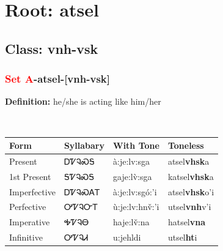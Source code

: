 \needspace{4in}
\section*{Root: atsel}
\nopagebreak
{}
\needspace{3in}
\subsection*{Class: vnh-vsk}
\nopagebreak
\needspace{2in}
\subsubsection*{\textcolor{Red}{Set A}{-}\textbf{atsel}{-}[vnh-vsk]}
\nopagebreak
\textbf{Definition: } he/she is acting like him/her
\\[0.5em]
\begin{tabularx}{\textwidth}{l X X X}%
\toprule%
\textbf{Form}&\textbf{Syllabary}&\textbf{With Tone}&\textbf{Toneless}\\%
\midrule%
Present&ᎠᏤᎸᏍᎦ&à:je:lv:sga&atsel\textbf{vhsk}a\\%
1st Present&ᎦᏤᎸᏍᎦ&gaje:lv̀:sga&katsel\textbf{vhsk}a\\%
Imperfective&ᎠᏤᎸᏍᎪᎢ&à:je:lv:sgó:’i&atsel\textbf{vhsk}o'i\\%
Perfective&ᎤᏤᎸᏅᎢ&ù:je:lv:hnv̌:’i&utsel\textbf{vnh}v'i\\%
Imperative&ᎭᏤᎸᎾ&haje:lv̌:na&hatsel\textbf{vna}\\%
Infinitive&ᎤᏤᎸᏗ&u:jehldi&utsel\textbf{ht}i\\%
\bottomrule%
\end{tabularx}
\\[1em]